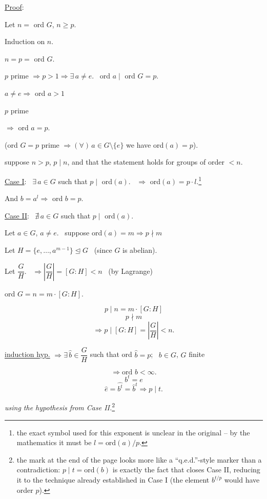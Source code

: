 \bigskip
\noindent\underline{Proof}:

\noindent Let $n=$ ord $G$, $n\geq p$.

\noindent Induction on $n$.

\bigskip
\noindent $n=p=$ ord $G$.

\noindent $p$ prime $\Rightarrow p>1 \Rightarrow \exists\, a\neq e$. \ ord $a\mid$ ord $G=p$.

\noindent $a\neq e \Rightarrow$ ord $a>1$

\noindent $p$ prime

\noindent $\Rightarrow$ ord $a=p$.

\bigskip
\noindent\big(ord $G=p$ prime $\Rightarrow (\forall)\,a\in G\setminus\{e\}$ we have ord$(a)=p$\big).

\bigskip
\noindent suppose $n>p$, $p\mid n$, and that the statement holds for groups of order $<n$.

\bigskip
\noindent\underline{Case I}: \ $\exists\, a\in G$ such that $p\mid$ ord$(a)$. \ $\Rightarrow$ ord$(a)=p\cdot l$.\footnote{the exact symbol used for this exponent is unclear in the original -- by the mathematics it must be $l=\text{ord}(a)/p$.}

\noindent And $b=a^l \Rightarrow$ ord $b=p$.

\bigskip
\noindent\underline{Case II}: \ $\nexists\, a\in G$ such that $p\mid$ ord$(a)$.

\bigskip
\noindent Let $a\in G$, $a\neq e$. \ suppose ord$(a)=m \Rightarrow p\nmid m$

\noindent Let $H=\{e,\ldots,a^{m-1}\}\trianglelefteq G$ \ (since $G$ is abelian).

\noindent Let $\dfrac{G}{H}$. \ $\Rightarrow \left|\dfrac{G}{H}\right| = [G:H] < n$ \ (by Lagrange)

\bigskip
\noindent ord $G = n = m\cdot[G:H]$.

\[
p\mid n = m\cdot[G:H]
\]
\[
p\nmid m
\]
\[
\Rightarrow p\mid [G:H] = \left|\dfrac{G}{H}\right| < n.
\]

\bigskip
\noindent\underline{induction hyp.} $\Rightarrow \exists\, \hat b\in \dfrac{G}{H}$ such that ord $\hat b=p$; \ $b\in G$, $G$ finite

\[
\Rightarrow \text{ord } b<\infty.
\]
\[
b^t=e
\]
\[
\hat e=\widehat{b^t}=\hat b^t \Rightarrow p\mid t.
\]

\noindent\textit{using the hypothesis from Case II.}\footnote{the mark at the end of the page looks more like a ``q.e.d.''-style marker than a contradiction: $p\mid t=\text{ord}(b)$ is exactly the fact that closes Case II, reducing it to the technique already established in Case I (the element $b^{t/p}$ would have order $p$).}





